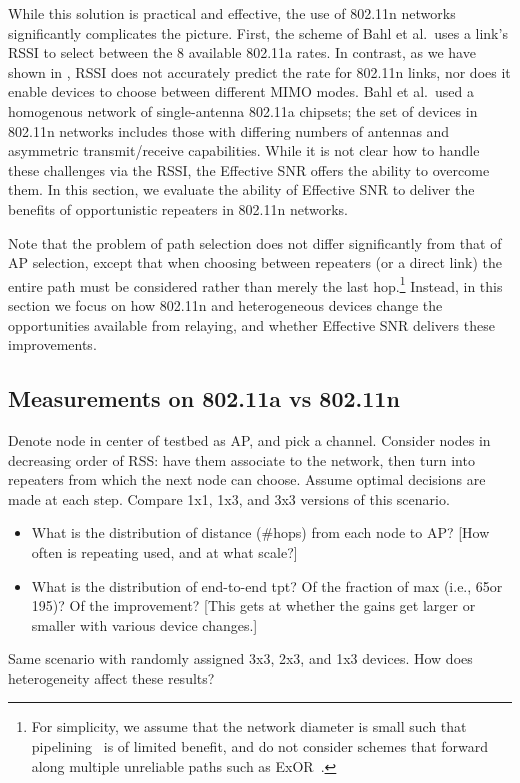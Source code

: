 While this solution is practical and effective, the use of 802.11n networks significantly complicates the picture. First, the scheme of Bahl et al.\ uses a link's RSSI to select between the 8 available 802.11a rates. In contrast, as we have shown in , RSSI does not accurately predict the rate for 802.11n links, nor does it enable devices to choose between different MIMO modes. Bahl et al.\ used a homogenous network of single-antenna 802.11a chipsets; the set of devices in 802.11n networks includes those with differing numbers of antennas and asymmetric transmit/receive capabilities. While it is not clear how to handle these challenges via the RSSI, the Effective SNR offers the ability to overcome them. In this section, we evaluate the ability of Effective SNR to deliver the benefits of opportunistic repeaters in 802.11n networks.

Note that the problem of path selection does not differ significantly from that of AP selection, except that when choosing between repeaters (or a direct link) the entire path must be considered rather than merely the last hop.\footnote{For simplicity, we assume that the network diameter is small such that pipelining~\cite{Rodrig_thesis} is of limited benefit, and do not consider schemes that forward along multiple unreliable paths such as ExOR~\cite{Biswas_ExOR}.} Instead, in this section we focus on how 802.11n and heterogeneous devices change the opportunities available from relaying, and whether Effective SNR delivers these improvements.

\subsection{Measurements on 802.11a vs 802.11n}
Denote node in center of testbed as AP, and pick a channel. Consider nodes in decreasing order of RSS: have them associate to the network, then turn into repeaters from which the next node can choose. Assume optimal decisions are made at each step. Compare 1x1, 1x3, and 3x3 versions of this scenario.
\begin{itemize}
\item What is the distribution of distance (\#hops) from each node to AP? [How often is repeating used, and at what scale?]
\item What is the distribution of end-to-end tpt? Of the fraction of max (i.e., 65\Mbps or 195\Mbps)? Of the improvement? [This gets at whether the gains get larger or smaller with various device changes.]
\end{itemize}
Same scenario with randomly assigned 3x3, 2x3, and 1x3 devices. How does heterogeneity affect these results?

